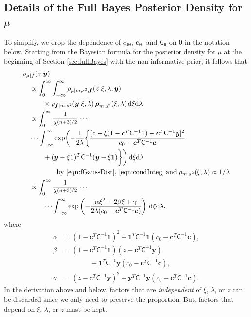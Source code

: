 \documentclass[twocolumn]{svjour3}          %
\newcommand{\bm}[1]{\boldsymbol{#1}}
\newcommand{\D}[1]{\text{d}{#1}}
\newcommand{\vtheta}{{\bm{\theta}}}
\newcommand{\vc}{\bm{c}}
\newcommand{\vf}{\bm{f}}
\newcommand{\vrho}{\bm{\rho}}
\newcommand{\vy}{\bm{y}}
\newcommand{\vone}{\bm{1}}
\newcommand{\mC}{\mathsf{C}}
\begin{document}
\begin{appendices}
\section{Details of the Full Bayes Posterior Density for $\mu$} \label{appendix:full_bayes}
To simplify, we drop the dependence of $c_{0\vtheta}$, $\vc_\vtheta$, and $\mC_\vtheta$ on $\vtheta$ in the notation below.
Starting from the Bayesian formula for the posterior density for $\mu$ at the beginning of Section \ref{sec:fullBayes} with the non-informative prior, it follows that 
\begin{align*}
\MoveEqLeft[1]{\rho_{\mu|\vf}(z | \vy)}\\
& \propto \int_{0}^\infty \int_{-\infty}^\infty 
\rho_{\mu | m, s^2, \vf}(z | \xi, \lambda , \vy) \\
& \qquad \times  \rho_{\vf | m, s^2} (\vy | \xi, \lambda) \, \vrho_{m,s^2}(\xi,\lambda)  \, \D \xi \D \lambda \\
& \propto \displaystyle \int_{0}^\infty  \frac{1}{\lambda^{(n+3)/2}} \cdots \\
& \cdots \int_{-\infty}^\infty  \exp \biggl( -\frac{1}{2\lambda}\biggl\{
\frac{
	[z - \xi (1 - \vc^T \mC^{-1} \vone)  -  \vc^T \mC^{-1} \vy]^2}
{c_0  -\vc ^T \mC^{-1} \vc}  \\
& \qquad + (\vy - \xi \vone)^T \mC^{-1}(\vy - \xi \vone) \biggr \} \biggr) \, \D \xi \D \lambda \\
& \qquad \qquad
\text{by \eqref{eqn:fGaussDist}, \eqref{eqn:condInteg}} \; \text{and} \; \rho_{m,s^2}(\xi,\lambda) \propto 1/\lambda \\
& \propto \displaystyle \int_{0}^\infty  \frac{1}{\lambda^{(n+3)/2}}  \cdots  \\ 
& \qquad  \cdots  \int_{-\infty}^\infty  \exp\left( -\frac{\alpha \xi^2 -2 \beta \xi + \gamma}{2\lambda(c_0  -\vc ^T \mC^{-1} \vc)} \right) \, \D \xi \D \lambda,
\end{align*}
where
\begin{align*}
\alpha & = (1 - \vc^T \mC^{-1} \vone)^2 + \vone^T \mC^{-1} \vone (c_0  -\vc ^T \mC^{-1} \vc),\\
\beta & =(1 - \vc^T \mC^{-1} \vone)(z - \vc^T \mC^{-1} \vy ) \\
& \qquad \qquad  + \vone^T \mC^{-1} \vy (c_0  -\vc ^T \mC^{-1} \vc),\\
\gamma &  = (z - \vc^T \mC^{-1} \vy )^2  + \vy^T \mC^{-1} \vy (c_0  -\vc ^T \mC^{-1} \vc).
\end{align*}
In the derivation above and below, factors that are \emph{independent} of $\xi$, $\lambda$, or $z$ can be discarded since we only need to preserve the proportion.  But, factors that depend on $\xi$, $\lambda$, or $z$ must be kept.  

\end{appendices}
\end{document}
